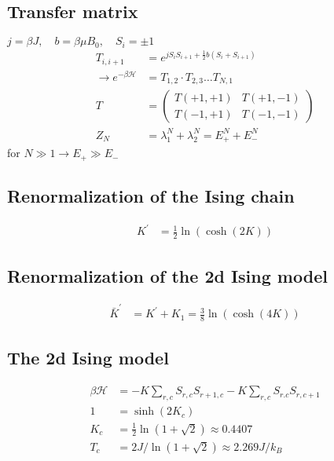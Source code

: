 \subsection*{Transfer matrix}
$j = \beta J, \quad b = \beta \mu B_0, \quad S_i = \pm 1$
\begin{equation*}
    \begin{aligned}
        T_{i,i+1} &= e^{jS_iS_{i+1} + \frac{1}{2}b(S_i + S_{i+1})} \\
        \rightarrow e^{-\beta \mathcal{H}} &= T_{1,2} \cdot T_{2,3} \dots T_{N,1} \\
        T &= \begin{pmatrix}
            T(+1,+1) & T(+1,-1)  \\
            T(-1,+1) & T(-1,-1)   
            \end{pmatrix}\\
        Z_N &= \lambda_1^N + \lambda_2^N = E_+^N + E_-^N 
    \end{aligned}
\end{equation*}
for $N \gg 1 \rightarrow E_+ \gg E_-$

\subsection*{Renormalization of the Ising chain}
\begin{equation*}
    \begin{aligned}
        K^{'} &= \frac{1}{2} \ln (\cosh (2K))
    \end{aligned}
\end{equation*}

\subsection*{Renormalization of the 2d Ising model}

\begin{equation*}
    \begin{aligned}
        \bar{K}^{'} &= K^{'} + K_1 = \frac{3}{8} \ln(\cosh(4K))
    \end{aligned}
\end{equation*}

\pagebreak
\subsection*{ The 2d Ising model}
\begin{equation*}
    \begin{aligned}
        \beta \mathcal{H} &= -K\sum_{r,c} S_{r,c} S_{r+1,c} - K \sum_{r,c} S_{r.c} S_{r,c+1} \\
        1 &= \sinh(2K_c) \\
        K_c &= \frac{1}{2} \ln \left(1+ \sqrt{2}\right) \approx 0.4407 \\
        T_c &= 2J / \ln \left(1 + \sqrt{2}\right) \approx 2.269 J/k_B
    \end{aligned}
\end{equation*}

